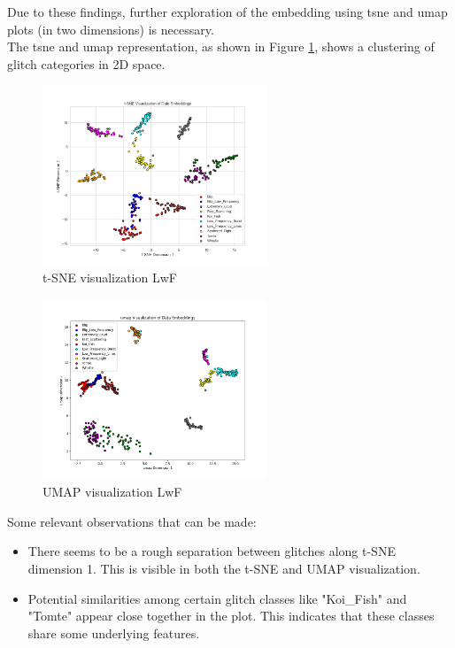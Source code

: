 Due to these findings, further exploration of the embedding using \acrshort{tsne} and \acrshort{umap} plots (in two dimensions) is necessary.\\ The \acrshort{tsne} and \acrshort{umap} representation, as shown in Figure \ref{fig:tSNE_LwF}, shows a clustering of glitch categories in 2D space.


\begin{figure}[ht]
\centering
    \centering
    \includegraphics[width=0.6\textwidth]{Images/tSNE_LwF_MultiView_testset_100epochs.png}
    \caption{t-SNE visualization LwF}
    \label{fig:tSNE_LwF}
\end{figure}

\begin{figure}[ht]
  \centering
    \includegraphics[width=0.6\textwidth]{Images/umap_MultiView_LwF_testset_100epochs.png}
    \caption{UMAP visualization LwF}
    \label{fig:umap_LwF}
\end{figure}


Some relevant observations that can be made: 
\begin{itemize}
    \item There seems to be a rough separation between glitches along t-SNE dimension 1. This is visible in both the t-SNE and UMAP visualization.  
    \item Potential similarities among certain glitch classes like "Koi\_Fish" and "Tomte" appear close together in the plot. This indicates that these classes share some underlying features. 
\end{itemize}

